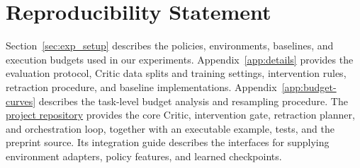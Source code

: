\section*{Reproducibility Statement}

Section~\ref{sec:exp_setup} describes the policies, environments, baselines, and execution budgets used in our experiments. Appendix~\ref{app:details} provides the evaluation protocol, Critic data splits and training settings, intervention rules, retraction procedure, and baseline implementations. Appendix~\ref{app:budget-curves} describes the task-level budget analysis and resampling procedure. The \href{https://github.com/JunHoo-Lee/ACRO}{project repository} provides the core Critic, intervention gate, retraction planner, and orchestration loop, together with an executable example, tests, and the preprint source. Its integration guide describes the interfaces for supplying environment adapters, policy features, and learned checkpoints.
